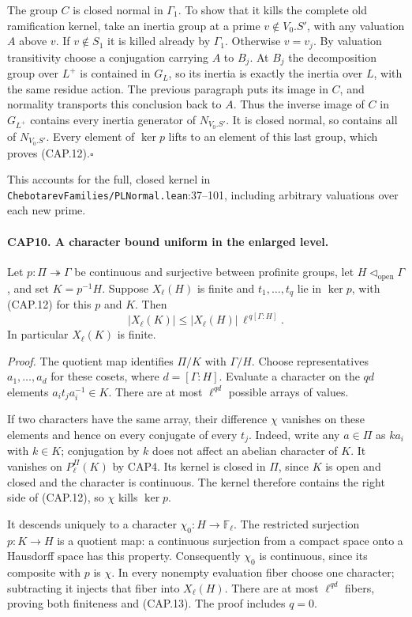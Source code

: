 The group $C$ is closed normal in $\Gamma_1$.  To show that it kills
the complete old ramification kernel, take an inertia group at a
prime $v\notin V_0.S'$, with any valuation $A$ above $v$.
If $v\notin S_1$ it is killed already by $\Gamma_1$.
Otherwise $v=v_j$.  By valuation transitivity choose a conjugation
carrying $A$ to $B_j$.  At $B_j$ the decomposition group over $L^+$
is contained in $G_L$, so its inertia is exactly the inertia over
$L$, with the same residue action.  The previous paragraph puts its
image in $C$, and normality transports this conclusion back to $A$.
Thus the inverse image of $C$ in $G_{L^+}$ contains every inertia
generator of $N_{V_0.S'}$.  It is closed normal, so contains all of
$N_{V_0.S'}$.  Every element of $\ker p$ lifts to an element of this
last group, which proves (CAP.12).\hfill$\square$

This accounts for the full, closed kernel in
\nolinkurl{ChebotarevFamilies/PLNormal.lean}:37--101, including arbitrary
valuations over each new prime.

\paragraph{CAP10. A character bound uniform in the enlarged level.}
\label{claim:CAP10}
Let $p:\Pi\twoheadrightarrow\Gamma$ be continuous and surjective
between profinite groups, let $H\triangleleft_{\mathrm{open}}\Gamma$,
and set $K=p^{-1}H$.  Suppose $X_\ell(H)$ is finite and $t_1,\ldots,t_q$
lie in $\ker p$, with (CAP.12) for this $p$ and $K$.  Then
\[
 |X_\ell(K)|\leq |X_\ell(H)|\,
       \ell^{\,q[\Gamma:H]}.
 \tag{CAP.13}
\]
In particular $X_\ell(K)$ is finite.

\emph{Proof.}
The quotient map identifies $\Pi/K$ with $\Gamma/H$.  Choose
representatives $a_1,\ldots,a_d$ for these cosets, where
$d=[\Gamma:H]$.  Evaluate a character on the $qd$ elements
$a_i t_j a_i^{-1}\in K$.  There are at most $\ell^{qd}$ possible
arrays of values.

If two characters have the same array, their difference $\chi$
vanishes on these elements and hence on every conjugate of every
$t_j$.  Indeed, write any $a\in\Pi$ as $k a_i$ with $k\in K$;
conjugation by $k$ does not affect an abelian character of $K$.
It vanishes on $P_\ell^\Pi(K)$ by CAP4.  Its kernel is closed in
$\Pi$, since $K$ is open and closed and the character is continuous.
The kernel therefore contains the right side of (CAP.12), so
$\chi$ kills $\ker p$.

It descends uniquely to a character $\chi_0:H\to\mathbb F_\ell$.
The restricted surjection $p:K\to H$ is a quotient map: a continuous
surjection from a compact space onto a Hausdorff space has this
property.  Consequently $\chi_0$ is continuous, since its composite
with $p$ is $\chi$.  In every nonempty evaluation fiber choose one
character; subtracting it injects that fiber into $X_\ell(H)$.
There are at most $\ell^{qd}$ fibers, proving both finiteness and
(CAP.13).  The proof includes $q=0$.

